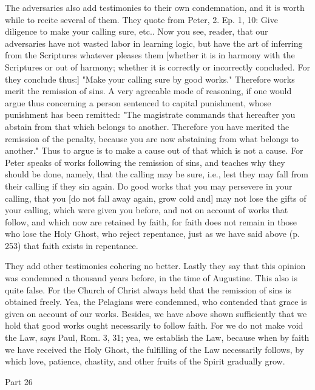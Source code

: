 The adversaries also add testimonies to their own condemnation, and
it is worth while to recite several of them.  They quote from Peter,
2. Ep. 1, 10: Give diligence to make your calling sure, etc..  Now
you see, reader, that our adversaries have not wasted labor in
learning logic, but have the art of inferring from the Scriptures
whatever pleases them [whether it is in harmony with the Scriptures
or out of harmony; whether it is correctly or incorrectly concluded.
For they conclude thus:] "Make your calling sure by good works."
Therefore works merit the remission of sins.  A very agreeable mode
of reasoning, if one would argue thus concerning a person sentenced
to capital punishment, whose punishment has been remitted: "The
magistrate commands that hereafter you abstain from that which
belongs to another.  Therefore you have merited the remission of the
penalty, because you are now abstaining from what belongs to another."
Thus to argue is to make a cause out of that which is not a cause.
For Peter speaks of works following the remission of sins, and
teaches why they should be done, namely, that the calling may be sure,
i.e., lest they may fall from their calling if they sin again.  Do
good works that you may persevere in your calling, that you [do not
fall away again, grow cold and] may not lose the gifts of your
calling, which were given you before, and not on account of works
that follow, and which now are retained by faith, for faith does not
remain in those who lose the Holy Ghost, who reject repentance, just
as we have said above (p. 253) that faith exists in repentance.

They add other testimonies cohering no better.  Lastly they say that
this opinion was condemned a thousand years before, in the time of
Augustine.  This also is quite false.  For the Church of Christ
always held that the remission of sins is obtained freely.  Yea, the
Pelagians were condemned, who contended that grace is given on
account of our works.  Besides, we have above shown sufficiently that
we hold that good works ought necessarily to follow faith.  For we do
not make void the Law, says Paul, Rom. 3, 31; yea, we establish the
Law, because when by faith we have received the Holy Ghost, the
fulfilling of the Law necessarily follows, by which love, patience,
chastity, and other fruits of the Spirit gradually grow.




Part 26


